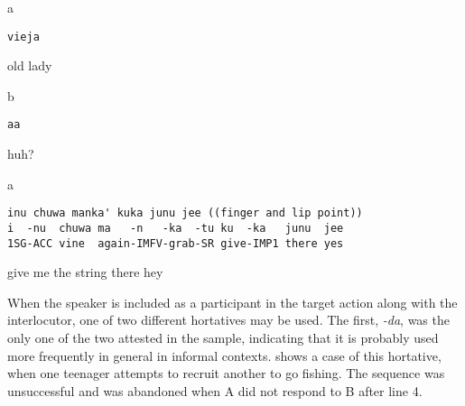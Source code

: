 \documentclass[output=paper]{langsci/langscibook}
\begin{document}
\vspace{2mm}
%
\begin{transbox}{1}{a}
\begin{verbatim}
vieja
\end{verbatim}
old lady
\end{transbox}
%
\begin{transbox}{2}{b}
\begin{verbatim}
aa
\end{verbatim}
huh?
\end{transbox}
%
\begin{mdframednoverticalspace}[style=firstfoc]
\begin{transbox}{3}{a}
\begin{verbatim}
inu chuwa manka' kuka junu jee ((finger and lip point))
i  -nu  chuwa ma   -n   -ka  -tu ku  -ka   junu  jee
1SG-ACC vine  again-IMFV-grab-SR give-IMP1 there yes
\end{verbatim}
give me the string there hey
\end{transbox}
\end{mdframednoverticalspace}
%
\begin{mdframednoverticalspace}[style=secondfoc]
\end{mdframednoverticalspace}

When the speaker is included as a participant in the target action along with the interlocutor, one of two different hortatives may be used. The first, \textit{{}-da}, was the only one of the two attested in the sample, indicating that it is probably used more frequently in general in informal contexts.  shows a case of this hortative, when one teenager attempts to recruit another to go fishing. The sequence was unsuccessful and was abandoned when A did not respond to B after line 4.
\end{document}
